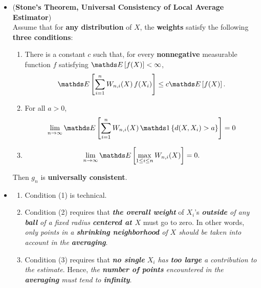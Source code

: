 \documentclass[11pt]{article}
\begin{document}
\begin{itemize}
\item \begin{theorem} (\textbf{Stone's Theorem, Universal Consistency of Local Average Estimator}) \citep{devroye2013probabilistic}\\
Assume that for \textbf{any distribution} of $X$, the \textbf{weights} satisfy the following \textbf{three conditions}:
\begin{enumerate}
\item There is a constant $c$ such that, for every \textbf{nonnegative} measurable function $f$ satisfying $\E{}{f(X)} < \infty$,
\begin{align*}
\E{}{\sum_{i=1}^{n}W_{n,i}(X)\,f(X_i)} \le c\E{}{f(X)}.
\end{align*}

\item For all $a > 0$,
\begin{align*}
\lim\limits_{n\rightarrow \infty}\E{}{\sum_{i=1}^{n}W_{n,i}(X)\,\ind{d(X, X_i) > a}} = 0
\end{align*}

\item 
\begin{align*}
\lim\limits_{n\rightarrow \infty}\E{}{\max_{1 \le i \le n}W_{n,i}(X)} = 0.
\end{align*}
\end{enumerate}
Then $g_n$ is \textbf{universally consistent}.
\end{theorem}

\item \begin{remark}
\begin{enumerate}
\item Condition (1) is technical.

\item Condition (2) requires that \emph{\textbf{the overall weight}} of $X_i$'s \emph{\textbf{outside} of any \textbf{ball} of a fixed radius \textbf{centered at $X$}} must go to zero. In other words, \emph{only points in a \textbf{shrinking neighborhood} of $X$ should be taken into account in the \textbf{averaging}}.

\item Condition (3) requires that \emph{\textbf{no single} $X_i$ has \textbf{too large} a contribution to the estimate}.
Hence, \emph{the \textbf{number of points} encountered in the \textbf{averaging} must tend to \textbf{infinity}}.
\end{enumerate}
\end{remark}
\end{itemize}
\end{document}

